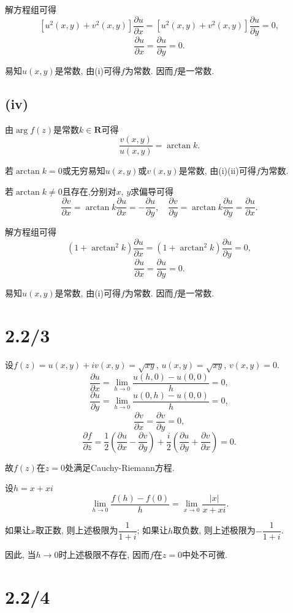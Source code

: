 \documentclass{article}
\begin{document}
解方程组可得
$$\left[u^2(x,y)+v^2(x,y)\right]\frac{\partial u}{\partial x}=\left[u^2(x,y)+v^2(x,y)\right]\frac{\partial u}{\partial y}=0,$$
$$\frac{\partial u}{\partial x}=\frac{\partial u}{\partial y}=0.$$

易知$u(x,y)$是常数, 由(i)可得$f$为常数. 因而$f$是一常数.

\subsection*{(iv)}

由$\arg f(z)$是常数$k\in\mathbf{R}$可得
$$\frac{v(x,y)}{u(x,y)}=\arctan k.$$

若$\arctan k=0$或无穷易知$u(x,y)$或$v(x,y)$是常数, 由(i)(ii)可得$f$为常数.

若$\arctan k\neq0$且存在,分别对$x$, $y$求偏导可得
$$\frac{\partial v}{\partial x}=\arctan k\frac{\partial u}{\partial x}=-\frac{\partial u}{\partial y},\quad\frac{\partial v}{\partial y}=\arctan k\frac{\partial u}{\partial y}=\frac{\partial u}{\partial x}.$$

解方程组可得
$$(1+\arctan^2k)\frac{\partial u}{\partial x}=(1+\arctan^2k)\frac{\partial u}{\partial y}=0,$$
$$\frac{\partial u}{\partial x}=\frac{\partial u}{\partial y}=0.$$

易知$u(x,y)$是常数, 由(i)可得$f$为常数. 因而$f$是一常数.

\section{2.2/3}

设$f(z)=u(x,y)+iv(x,y)=\sqrt{xy}$, $u(x,y)=\sqrt{xy}$, $v(x,y)=0$.
$$\frac{\partial u}{\partial x}=\lim_{h\to0}\frac{u(h,0)-u(0,0)}{h}=0,$$
$$\frac{\partial u}{\partial y}=\lim_{h\to0}\frac{u(0,h)-u(0,0)}{h}=0,$$
$$\frac{\partial v}{\partial x}=\frac{\partial v}{\partial y}=0,$$
$$\frac{\partial f}{\partial\bar{z}}=\frac{1}{2}\left(\frac{\partial u}{\partial x}-\frac{\partial v}{\partial y}\right)+\frac{i}{2}\left(\frac{\partial u}{\partial y}+\frac{\partial v}{\partial x}\right)=0.$$

故$f(z)$在$z=0$处满足Cauchy-Riemann方程.

设$h=x+xi$
$$\lim_{h\to0}\frac{f(h)-f(0)}{h}=\lim_{x\to0}\frac{|x|}{x+xi}.$$

如果让$x$取正数, 则上述极限为$\dfrac{1}{1+i}$; 如果让$h$取负数, 则上述极限为$-\dfrac{1}{1+i}$.

因此, 当$h\to0$时上述极限不存在, 因而$f$在$z=0$中处不可微.

\section{2.2/4}
\end{document}
